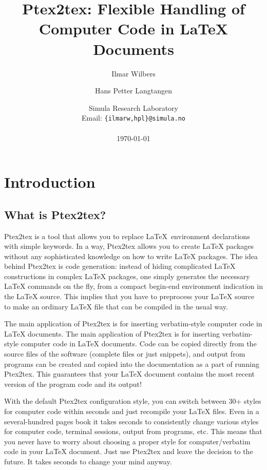 \documentclass[a4paper,11pt]{article}
\begin{document}
\title{Ptex2tex: Flexible Handling of Computer Code in \LaTeX{} Documents}
\author{Ilmar Wilbers \and Hans Petter Langtangen}

\date{Simula Research Laboratory\\ 
Email: \texttt{\{ilmarw,hpl\}@simula.no}\\
\ \ \\
\today}
\maketitle

\section{Introduction}
\subsection{What is Ptex2tex?}
Ptex2tex is a tool that allows you to replace \LaTeX~environment declarations
with simple keywords. In a way, Ptex2tex allows you to create \LaTeX{}
packages without any sophisticated knowledge on how to write
\LaTeX{} packages. The idea behind Ptex2tex is code generation: instead
of hiding complicated \LaTeX{} constructions in complex \LaTeX{}
packages, one simply generates the necessary \LaTeX{} commands on the
fly, from a compact begin-end environment indication in the \LaTeX{}
source.
This implies that you have to preprocess your LaTeX source
to make an ordinary LaTeX file that can be compiled in the usual way.

The main application of Ptex2tex is for inserting verbatim-style
computer code in \LaTeX{} documents.  The main application of Ptex2tex
is for inserting verbatim-style computer code in \LaTeX{}
documents. Code can be copied directly from the source files of the
software (complete files or just snippets), and output from programs
can be created and copied into the documentation as a part of running
Ptex2tex.  This guarantees that your LaTeX document contains the most
recent version of the program code and its output!


With the default Ptex2tex
configuration style, you can switch between 30+ styles for computer
code within seconds and just recompile your \LaTeX{} files.
Even in a several-hundred pages book it takes seconds to consistently
change various styles for computer code, terminal sessions, output
from programs, etc. This means that you never have to worry about
choosing a proper style for computer/verbatim code in your \LaTeX{} document.
Just use Ptex2tex and leave the decision to the future. It takes
seconds to change your mind anyway.
\end{document}
